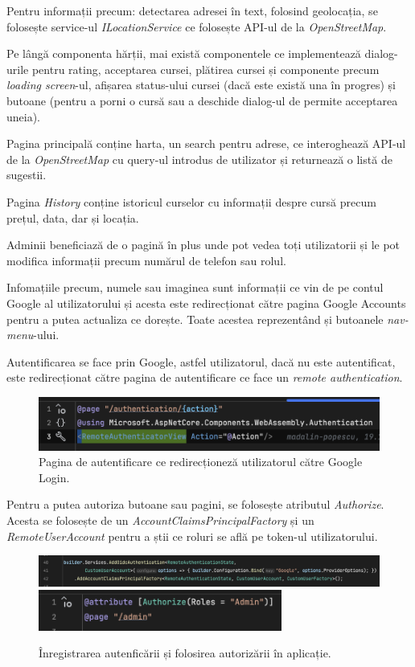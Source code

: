 Pentru informații precum: detectarea adresei în text, folosind geolocația, se folosește service-ul
\textit{ILocationService} ce folosește API-ul de la \textit{OpenStreetMap}.

Pe lângă componenta hărții, mai există componentele ce implementează dialog-urile pentru
rating, acceptarea cursei, plătirea cursei și componente precum \textit{loading screen}-ul,
afișarea status-ului cursei (dacă este există una în progres) și butoane (pentru a porni o cursă sau a deschide dialog-ul de permite acceptarea uneia).

Pagina principală conține harta, un search pentru adrese, ce interoghează API-ul de la \textit{OpenStreetMap}
cu query-ul introdus de utilizator și returnează o listă de sugestii. 

Pagina \textit{History} conține
istoricul curselor cu informații despre cursă precum prețul, data, dar și locația. 

Adminii beneficiază de o pagină în plus
unde pot vedea toți utilizatorii și le pot modifica informații precum numărul de telefon sau rolul.

Infomațiile precum, numele sau imaginea sunt informații ce vin de pe contul Google al utilizatorului și acesta 
este redirecționat către pagina Google Accounts pentru a putea actualiza ce dorește. Toate acestea reprezentând și butoanele \textit{nav-menu}-ului.

Autentificarea se face prin Google, astfel utilizatorul, dacă nu este autentificat, este redirecționat către
pagina de autentificare ce face un \textit{remote authentication}.

\begin{figure}[H]
    \centering
    \includegraphics[width=14cm]{Assets/authenticationRemote.png}
    \caption{Pagina de autentificare ce redirecționeză utilizatorul către Google Login.}
    \label{fig:authenticationRemote}
\end{figure}

Pentru a putea autoriza butoane sau pagini, se folosește atributul \textit{Authorize}. Acesta se folosește de
un \textit{AccountClaimsPrincipalFactory} și un \textit{RemoteUserAccount} pentru a știi ce roluri se află pe token-ul utilizatorului.

\begin{figure}[H]
    \centering
    \includegraphics[width=16cm]{Assets/registerAuthentication.png}
    \includegraphics[width=8cm]{Assets/authorizeAttribute.png}
    \caption{Înregistrarea autenficării și folosirea autorizării în aplicație.}
    \label{fig:registerUseAuth}
\end{figure}

